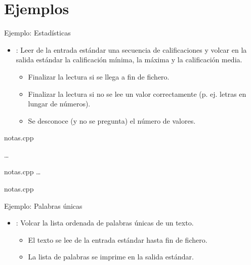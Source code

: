 \section{Ejemplos}

\begin{frame}[t]{Ejemplo: Estadísticas}
\begin{itemize}
  \item {}: Leer de la entrada estándar una secuencia de calificaciones
    y volcar en la salida estándar la calificación mínima, la máxima y la calificación media.
    \begin{itemize}
      \item Finalizar la lectura si se llega a fin de fichero.
      \item Finalizar la lectura si no se lee un valor correctamente (p. ej. letras en lungar de números).
      \item Se desconoce (y  no se pregunta) el número de valores.
    \end{itemize}
\end{itemize}
\end{frame}

 {

\begin{frame}
\begin{block}{notas.cpp}

\ldots
\end{block}
\end{frame}

\begin{frame}
\begin{block}{notas.cpp}
\ldots

\end{block}
\end{frame}

}

 {
\begin{frame}
\begin{block}{notas.cpp}

\end{block}
\end{frame}
}

\begin{frame}[t]{Ejemplo: Palabras únicas}
\begin{itemize}
  \item {}: Volcar la lista ordenada de palabras únicas de un texto.
    \begin{itemize}
      \item El texto se lee de la entrada estándar hasta fin de fichero.
      \item La lista de palabras se imprime en la salida estándar.
    \end{itemize}
\end{itemize}
\end{frame}


